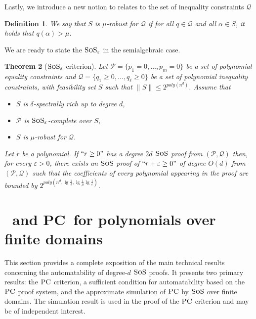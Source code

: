 \documentclass[11pt]{article}
\newcommand{\sos}{\text{\sc{SoS}}}
\newcommand{\PC}{\textsc{PC}}
\newcommand{\1}{\textbf{1}}
\newtheorem{theorem}{Theorem}[section]
\newtheorem{definition}[theorem]{Definition}
\begin{document}
Lastly, we introduce a new notion to relates to the set of inequality constraints $\mathcal{Q}$

\begin{definition}
    We say that $S$ is $\mu$-robust for $\mathcal{Q}$ if for all $q \in \mathcal{Q}$ and all $\alpha \in S$, it holds that $q(\alpha) > \mu$. 
\end{definition}

We are ready to state the $\sos_{\varepsilon}$ in the semialgebraic case.

\begin{theorem}[$\sos_{\varepsilon}$ criterion]\label{th:SoS_Criterion_semialgebraic}
    Let $\mathcal{P} = \{p_1=0,\ldots,p_m=0\}$ be a set of polynomial equality constraints and $\mathcal{Q} = \{q_1 \geq 0, \ldots, q_\ell \geq 0\}$ be a set of polynomial inequality constraints, with feasibility set $S$ such that $\| S \| \leq 2^{poly(n^d)}$.
    Assume that
    \begin{itemize}
        \item [1)] $S$ is $\delta$-spectrally rich up to degree $d$, 
        \item [2)] $\mathcal{P}$ is $\sos_\varepsilon$-complete over $S$,
        \item [3)] $S$ is $\mu$-robust for $\mathcal{Q}$.
    \end{itemize}
    Let $r$ be a polynomial. If $``r \geq 0"$ has a degree $2d$ $\sos$ proof from $(\mathcal{P}, \mathcal{Q})$
then, for every $\varepsilon>0$, there exists an $\sos$ proof of $``r+\varepsilon \geq 0"$ of degree $O(d)$ from $(\mathcal{P}, \mathcal{Q})$
such that the coefficients of every polynomial appearing in the proof are bounded by $2^{poly(n^d, \lg \frac{1}{\delta}, \lg \frac{1}{\mu} \lg \frac{1}{\varepsilon})}$.
\end{theorem}





\section{\sos\ and \PC\ for polynomials over finite domains}\label{sect:PC_criterion}

This section provides a complete exposition of the main technical results concerning the automatability of degree-$d$ $\sos$ proofs. It presents two primary results: the $\PC$ criterion, a sufficient condition for automatability based on the $\PC$ proof system, and the approximate simulation of $\PC$ by $\sos$ over finite domains. The simulation result is used in the proof of the $\PC$ criterion and may be of independent interest.
\end{document}
